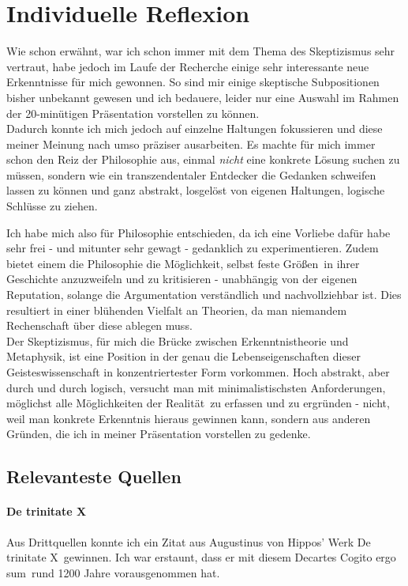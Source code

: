 \documentclass[12pt,a4paper,final]{article}
\begin{document}
\section*{Individuelle Reflexion}
Wie schon erwähnt, war ich schon immer mit dem Thema des Skeptizismus sehr vertraut, habe jedoch im Laufe der Recherche einige sehr interessante neue Erkenntnisse für mich gewonnen. So sind mir einige skeptische Subpositionen bisher unbekannt gewesen und ich bedauere, leider nur eine Auswahl im Rahmen der 20-minütigen Präsentation vorstellen zu können.\\
Dadurch konnte ich mich jedoch auf einzelne Haltungen fokussieren und diese meiner Meinung nach umso präziser ausarbeiten. Es machte für mich immer schon den Reiz der Philosophie aus, einmal \emph{nicht} eine konkrete Lösung suchen zu müssen, sondern wie ein transzendentaler Entdecker die Gedanken schweifen lassen zu können und ganz abstrakt, losgelöst von eigenen Haltungen, logische Schlüsse zu ziehen.

Ich habe mich also für Philosophie entschieden, da ich eine Vorliebe dafür habe sehr frei - und mitunter sehr gewagt - gedanklich zu experimentieren. Zudem bietet einem die Philosophie die Möglichkeit, selbst feste \glqq Größen\grqq\ in ihrer Geschichte anzuzweifeln und zu kritisieren - unabhängig von der eigenen Reputation, solange die Argumentation verständlich und nachvollziehbar ist. Dies resultiert in einer blühenden Vielfalt an Theorien, da man niemandem Rechenschaft über diese ablegen muss.\\
Der Skeptizismus, für mich die Brücke zwischen Erkenntnistheorie und Metaphysik, ist eine Position in der genau die Lebenseigenschaften dieser Geisteswissenschaft in konzentriertester Form vorkommen. Hoch abstrakt, aber durch und durch logisch, versucht man mit minimalistischsten Anforderungen, möglichst alle Möglichkeiten der \glqq Realität\grqq\ zu erfassen und zu ergründen - nicht, weil man konkrete Erkenntnis hieraus gewinnen kann, sondern aus anderen Gründen, die ich in meiner Präsentation vorstellen zu gedenke.
%
\subsection*{Relevanteste Quellen}
\paragraph*{De trinitate X \cite{de_trini_x}} Aus Drittquellen konnte ich ein Zitat aus Augustinus von Hippos' Werk \glqq De trinitate X\grqq\  gewinnen. Ich war erstaunt, dass er mit diesem Decartes \glqq Cogito ergo sum\grqq\ rund 1200 Jahre vorausgenommen hat.
%
\end{document}
